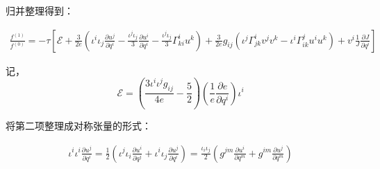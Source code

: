 \documentclass[LBMDerivation.tex]{subfiles}
\begin{document}



归并整理得到：


\begin{equation}
  \begin{gathered}
    \frac{f^{(1)}}{f^{(0)}}=
    -\tau [ \mathcal{E}
      +\frac{3}{2e}(\iota^i \iota_j \frac{\partial u^j}{\partial q^i} -\frac{\iota^j\iota_j}{3}\frac{\partial u^i}{\partial q^i}-\frac{\iota^j\iota_j}{3} \Gamma_{ki}^i u^k)
      + \frac{3}{2e} g_{ij} (\iota^j\Gamma_{j k}^{i} v^j v^k - \iota^i\Gamma_{i k}^{j} u^i u^k) + v^i  \frac{1}{J}\frac{\partial J}{\partial q^i}
    ]
  \end{gathered}
\end{equation}

记，
$$
  \mathcal{E}= (\frac{3 {\iota^i\iota^jg_{ij}}}{4e}-\frac{5}{2}) (\frac{1}{e}\frac{\partial e}{\partial q^i})\iota^i
$$


将第二项整理成对称张量的形式：


\begin{equation}
  \begin{gathered}
    \iota^i \iota^i \frac{\partial u^j}{\partial q^i} =\frac{1}{2} (\iota^j \iota_i \frac{\partial u^i}{\partial q^j}+  \iota^i \iota_j \frac{\partial u^j}{\partial q^i})
    = \frac{\iota_i \iota_j}{2} (g^{jm} \frac{\partial u^i}{\partial q^m}+g^{im} \frac{\partial u^j}{\partial q^m})
  \end{gathered}
\end{equation}
\end{document}
